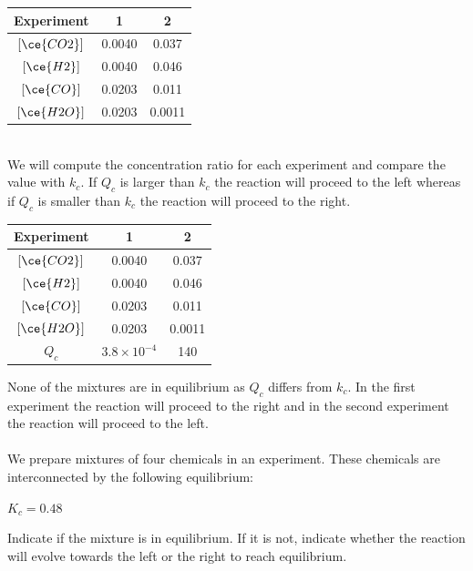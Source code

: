\documentclass[main.tex]{subfiles}
\begin{document}
\begin{description}
\begin{example}
\begin{center}\begin{tabular}[t]{   ccc    }
\toprule
Experiment&			1		&	2		 \\
\midrule

$[\ce{CO2}]$&			0.0040	&	0.037	 \\
$[\ce{H2}]$&			0.0040	&	0.046	 \\
$[\ce{CO}]$&			0.0203	&	0.011	 \\
$[\ce{H2O}]$&			0.0203	&	0.0011	 \\
\bottomrule
\end{tabular}\end{center}
 
\\
We will compute the concentration ratio for each experiment and compare the value with $k_c$. If $Q_c$ is larger than $k_c$ the reaction will proceed to the left whereas if $Q_c$ is smaller than $k_c$ the reaction will proceed to the right.
\begin{center}\begin{tabular}[t]{   ccc    }
\toprule
Experiment&			1		&	2		 \\
\midrule
$[\ce{CO2}]$&			0.0040	&	0.037	 \\
$[\ce{H2}]$&			0.0040	&	0.046	 \\
$[\ce{CO}]$&			0.0203	&	0.011	 \\
$[\ce{H2O}]$&			0.0203	&	0.0011	 \\
$Q_c$&			$3.8\times 10^{-4}$	&	140	 \\
\bottomrule
\end{tabular}\end{center}
None of the mixtures are in equilibrium as $Q_c$ differs from $k_c$. In the first experiment the reaction will proceed to the right and in the second experiment the reaction will proceed to the left.
\\
\faDiamond\ \\
We prepare mixtures of four chemicals in an experiment. These chemicals are interconnected by the following equilibrium:
\begin{center}\hfill $K_c =0.48$\end{center}
Indicate if the mixture is in equilibrium. If it is not, indicate whether the reaction will evolve towards the left or the right to reach equilibrium.\begin{center}\begin{tabular}[t]{   cc     }

\end{tabular}
\end{center}
\end{example}
\end{description}
\end{document}
